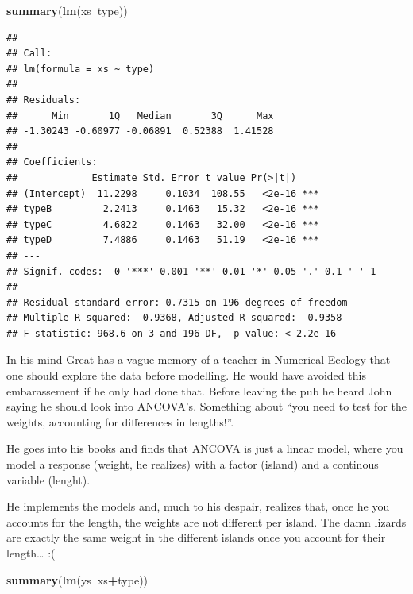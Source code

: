 \documentclass[
]{book}
\newenvironment{Shaded}{\begin{snugshade}}{\end{snugshade}}
\newcommand{\KeywordTok}[1]{\textcolor[rgb]{0.13,0.29,0.53}{\textbf{#1}}}
\newcommand{\NormalTok}[1]{#1}
\newcommand{\OperatorTok}[1]{\textcolor[rgb]{0.81,0.36,0.00}{\textbf{#1}}}
\begin{document}
\begin{Shaded}
\begin{Highlighting}[]
\KeywordTok{summary}\NormalTok{(}\KeywordTok{lm}\NormalTok{(xs}\OperatorTok{~}\NormalTok{type))}
\end{Highlighting}
\end{Shaded}

\begin{verbatim}
## 
## Call:
## lm(formula = xs ~ type)
## 
## Residuals:
##      Min       1Q   Median       3Q      Max 
## -1.30243 -0.60977 -0.06891  0.52388  1.41528 
## 
## Coefficients:
##             Estimate Std. Error t value Pr(>|t|)    
## (Intercept)  11.2298     0.1034  108.55   <2e-16 ***
## typeB         2.2413     0.1463   15.32   <2e-16 ***
## typeC         4.6822     0.1463   32.00   <2e-16 ***
## typeD         7.4886     0.1463   51.19   <2e-16 ***
## ---
## Signif. codes:  0 '***' 0.001 '**' 0.01 '*' 0.05 '.' 0.1 ' ' 1
## 
## Residual standard error: 0.7315 on 196 degrees of freedom
## Multiple R-squared:  0.9368,	Adjusted R-squared:  0.9358 
## F-statistic: 968.6 on 3 and 196 DF,  p-value: < 2.2e-16
\end{verbatim}

In his mind Great has a vague memory of a teacher in Numerical Ecology that one should explore the data before modelling. He would have avoided this embarassement if he only had done that. Before leaving the pub he heard John saying he should look into ANCOVA's. Something about ``you need to test for the weights, accounting for differences in lengths!''.

He goes into his books and finds that ANCOVA is just a linear model, where you model a response (weight, he realizes) with a factor (island) and a continous variable (lenght).

He implements the models and, much to his despair, realizes that, once he you accounts for the length, the weights are not different per island. The damn lizards are exactly the same weight in the different islands once you account for their length\ldots{} :(

\begin{Shaded}
\begin{Highlighting}[]
\KeywordTok{summary}\NormalTok{(}\KeywordTok{lm}\NormalTok{(ys}\OperatorTok{~}\NormalTok{xs}\OperatorTok{+}\NormalTok{type))}
\end{Highlighting}
\end{Shaded}
\end{document}
